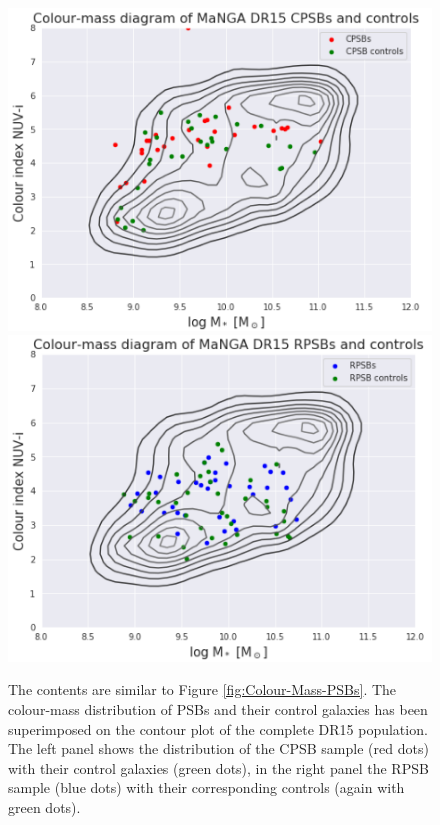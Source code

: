 \begin{figure}
    \centering
    \includegraphics[width=\columnwidth]{images/CMDs/Colour-mass-CPSB+controls.png}
    \includegraphics[width=\columnwidth]{images/CMDs/Colour-mass-RPSB+controls.png}
    \caption[Colour-mass distribution of PSBs and controls]{The contents are similar to Figure \ref{fig:Colour-Mass-PSBs}. The colour-mass distribution of PSBs and their control galaxies has been superimposed on the contour plot of the complete DR15 population. The left panel shows the distribution of the CPSB sample (red dots) with their control galaxies (green dots), in the right panel the RPSB sample (blue dots) with their corresponding controls (again with green dots).}
    \label{fig:Colour-Mass-PSBs-controls}
\end{figure}

